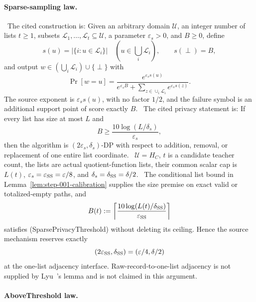 \paragraph{Sparse-sampling law.}

\noindent \ The cited construction is: Given an arbitrary domain \(\mathcal U\), an
  integer number of lists \(t\ge1\), subsets
  \(\mathcal L_1,\ldots,\mathcal L_t\subseteq\mathcal U\), a parameter
  \(\varepsilon_s>0\), and \(B\ge0\), define
  \[
  s(u)=|\{i:u\in\mathcal L_i\}|\quad
  (u\in\textstyle\bigcup_i\mathcal L_i),
  \qquad s(\perp)=B,
  \]
  and output \(w\in(\bigcup_i\mathcal L_i)\cup\{\perp\}\) with
  \[
  \Pr[w=u]
  =\frac{e^{\varepsilon_s s(u)}}
  {e^{\varepsilon_s B}+
    \sum_{z\in\cup_i\mathcal L_i}e^{\varepsilon_s s(z)}}.
  \tag{SparseLaw}
  \]
  The source exponent is \(\varepsilon_s s(u)\), with no factor \(1/2\),
  and the failure symbol is an additional support point of score exactly
  \(B\).
\noindent \ The cited privacy statement is: If every list has size at most \(L\) and
  \[
  B\ge \frac{10\log(L/\delta_s)}{\varepsilon_s},
  \tag{SparsePrivacyThreshold}
  \]
  then the algorithm is \((2\varepsilon_s,\delta_s)\)-DP with respect to
  addition, removal, or replacement of one entire list coordinate.
\noindent \  \(\mathcal U=H_C\), \(t\) is a candidate teacher count,
  the lists are actual quotient-function lists, their common scalar cap is
  \(L(t)\), \(\varepsilon_s=\varepsilon_{\rm SS}=\varepsilon/8\), and
  \(\delta_s=\delta_{\rm SS}=\delta/2\).
\noindent \  The conditional list bound in
  Lemma~\ref{lem:step-001-calibration} supplies the size premise on exact
  valid or totalized-empty paths, and
  \[
  B(t):=\left\lceil
  \frac{10\log(L(t)/\delta_{\rm SS})}{\varepsilon_{\rm SS}}
  \right\rceil
  \]
  satisfies (SparsePrivacyThreshold) without deleting its ceiling. Hence the
  source mechanism reserves exactly
  \[
  (2\varepsilon_{\rm SS},\delta_{\rm SS})
  =(\varepsilon/4,\delta/2)
  \]
  at the one-list adjacency interface. Raw-record-to-one-list adjacency is
  not supplied by Lyu~\citep{lyu2025}'s lemma and is not claimed in this argument.

\paragraph{AboveThreshold law.}

